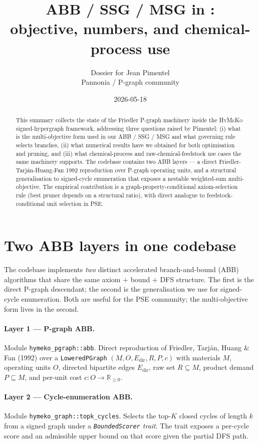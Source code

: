 \documentclass[11pt,a4paper]{article}
\title{ABB / SSG / MSG in \HyMeKo:\\[4pt]
       \large\normalfont objective, numbers, and chemical-process use}
\author{Dossier for Jean Pimentel\\
        \small Pannonia / P-graph community}
\date{2026-05-18}
\newcommand{\HyMeKo}{\textsc{HyMeKo}}
\newcommand{\code}[1]{\texttt{\small #1}}
\begin{document}
\maketitle

\begin{abstract}
\noindent
This summary collects the state of the Friedler P-graph machinery
inside the \HyMeKo{} signed-hypergraph framework, addressing three
questions raised by Pimentel: (i) what is the multi-objective form
used in our ABB / SSG / MSG and what governing rule selects branches,
(ii) what numerical results have we obtained for both optimisation
and pruning, and (iii) what chemical-process and raw-chemical-feedstock
use cases the same machinery supports. The codebase contains two ABB
layers --- a direct Friedler-Tarj\'an-Huang-Fan 1992 reproduction over
P-graph operating units, and a structural generalisation to signed-cycle
enumeration that exposes a nestable weighted-sum multi-objective.
The empirical contribution is a graph-property-conditional
axiom-selection rule (best pruner depends on a structural ratio), with
direct analogue to feedstock-conditional unit selection in PSE.
\end{abstract}

\section{Two ABB layers in one codebase}

The codebase implements \emph{two} distinct accelerated branch-and-bound
(ABB) algorithms that share the same axiom + bound + DFS structure.
The first is the direct P-graph descendant; the second is the
generalisation we use for signed-cycle enumeration. Both are useful
for the PSE community; the multi-objective form lives in the second.

\paragraph{Layer 1 --- P-graph ABB.} Module \code{hymeko\_pgraph::abb}.
Direct reproduction of Friedler, Tarj\'an, Huang \& Fan (1992) over a
\code{LoweredPGraph} $(M, O, E_{\text{dir}}, R, P, c)$ with materials
$M$, operating units $O$, directed bipartite edges $E_{\text{dir}}$,
raw set $R \subseteq M$, product demand $P \subseteq M$, and per-unit
cost $c: O \to \mathbb{R}_{\geq 0}$.

\paragraph{Layer 2 --- Cycle-enumeration ABB.} Module
\code{hymeko\_graph::topk\_cycles}. Selects the top-$K$ closed cycles
of length $k$ from a signed graph under a \emph{\code{BoundedScorer}
trait}. The trait exposes a per-cycle score and an admissible upper
bound on that score given the partial DFS path.
\end{document}
